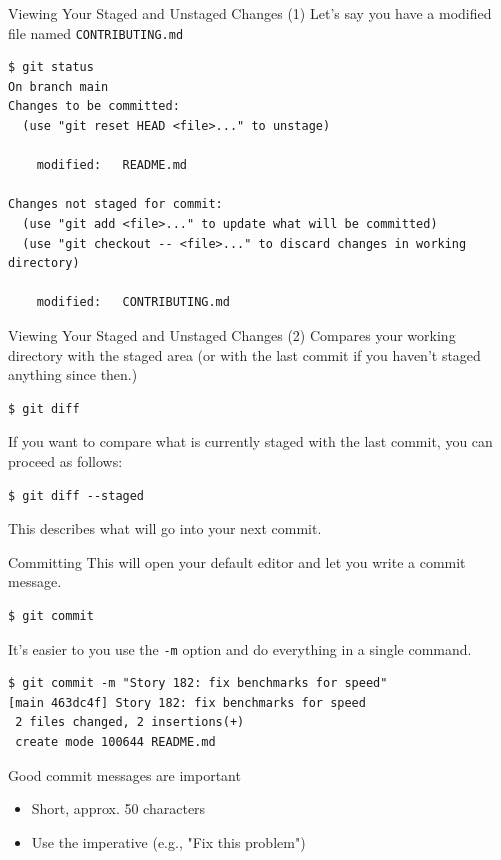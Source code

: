 \documentclass[handout]{beamer}
\begin{document}
\begin{frame}[fragile]{Viewing Your Staged and Unstaged Changes (1)}
Let's say you have a modified file named \texttt{CONTRIBUTING.md}
\begin{lstlisting}
$ git status
On branch main
Changes to be committed:
  (use "git reset HEAD <file>..." to unstage)

    modified:   README.md

Changes not staged for commit:
  (use "git add <file>..." to update what will be committed)
  (use "git checkout -- <file>..." to discard changes in working directory)

    modified:   CONTRIBUTING.md
\end{lstlisting}
\end{frame}

\begin{frame}[fragile]{Viewing Your Staged and Unstaged Changes (2)}
Compares your working directory with the staged area (or with the last commit if you haven't staged anything since then.)
\begin{lstlisting}
$ git diff
\end{lstlisting}
If you want to compare what is currently staged with the last commit, you can proceed as follows:
\begin{lstlisting}
$ git diff --staged
\end{lstlisting}
This describes what will go into your next commit. 
\end{frame}

\begin{frame}[fragile]{Committing}
This will open your default editor and let you write a commit message.
\begin{lstlisting}
$ git commit
\end{lstlisting}
It's easier to you use the \texttt{-m} option and do everything in a single command.
\begin{lstlisting}
$ git commit -m "Story 182: fix benchmarks for speed"
[main 463dc4f] Story 182: fix benchmarks for speed
 2 files changed, 2 insertions(+)
 create mode 100644 README.md
\end{lstlisting}
Good commit messages are important
\begin{itemize}
	\item Short, approx. 50 characters
	\item Use the imperative (e.g., "Fix this problem")
\end{itemize}
\end{frame}
\end{document}
